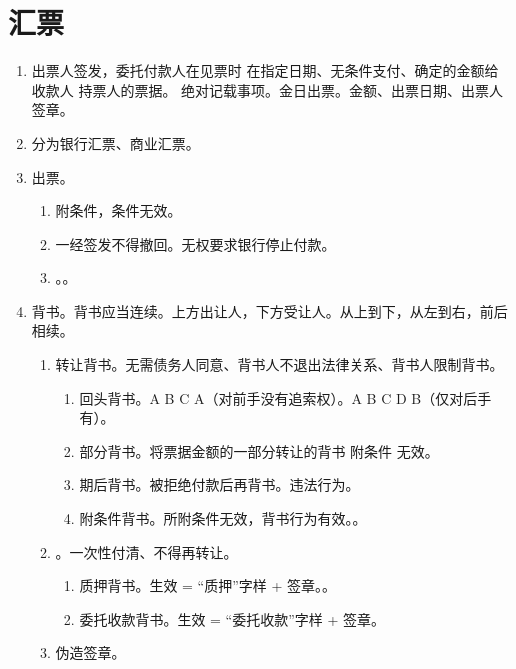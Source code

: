 \section{汇票}
\begin{enumerate}
  \item 出票人签发，委托付款人在见票时 \hz 在指定日期、无条件支付、确定的金额给收款人 \hz 持票人的票据。
        \yjt 绝对记载事项。金日出票。金额、出票日期、出票人签章。
  \item 分为银行汇票、商业汇票。
  \item 出票。
        \begin{enumerate}
          \item 附条件，条件无效。
          \item 一经签发不得撤回。无权要求银行停止付款。
          \item {}。。
        \end{enumerate}
  \item 背书。背书应当连续。上方出让人，下方受让人。从上到下，从左到右，前后相续。
        \begin{enumerate}
          \item 转让背书。无需债务人同意、背书人不退出法律关系、背书人限制背书。
                \begin{enumerate}
                  \item 回头背书。A \yjt B \yjt C \yjt A（对前手没有追索权）。A \yjt B \yjt C \yjt D \yjt B（仅对后手有）。
                  \item 部分背书。将票据金额的一部分转让的背书 \yjt 附条件 \yjt 无效。
                  \item 期后背书。被拒绝付款后再背书。违法行为。
                  \item 附条件背书。所附条件无效，背书行为有效。。
                \end{enumerate}
          \item {}。一次性付清、不得再转让。
                \begin{enumerate}
                  \item 质押背书。生效 = “质押”字样 + 签章。。
                  \item 委托收款背书。生效 = “委托收款”字样 + 签章。
                \end{enumerate}
          \item 伪造签章。
        \end{enumerate}

\end{enumerate}
